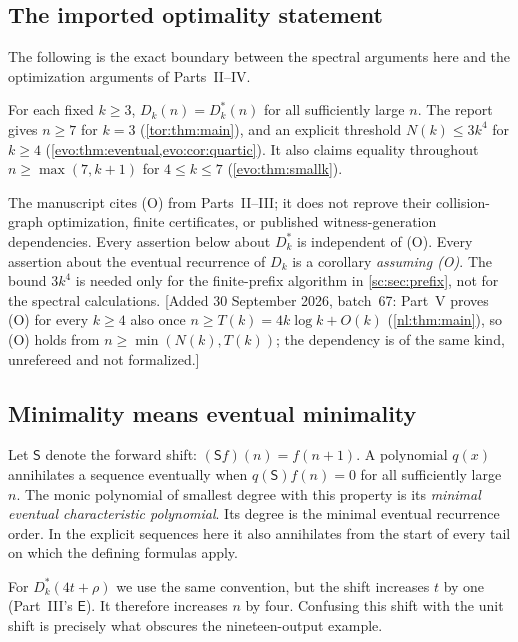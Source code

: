 \documentclass[11pt,a4paper]{article}
\numberwithin{equation}{section}
\theoremstyle{definition}
\theoremstyle{remark}
\begin{document}
\subsection{The imported optimality statement}\label{sc:sec:imported}
The following is the exact boundary between the spectral arguments here
and the optimization arguments of Parts~II--IV.

\begin{description}[style=nextline,leftmargin=1.0cm]
\item[Repository input (O).]
For each fixed $k\ge3$, $D_k(n)=D^*_k(n)$ for all sufficiently large $n$.
The report gives $n\ge7$ for $k=3$ (\cref{tor:thm:main}), and an explicit
threshold $N(k)\le3k^4$ for $k\ge4$ (\cref{evo:thm:eventual,evo:cor:quartic}).
It also claims equality throughout $n\ge\max(7,k+1)$ for $4\le k\le7$
(\cref{evo:thm:smallk}).
\end{description}

The manuscript cites (O) from Parts~II--III; it does not reprove their
collision-graph optimization, finite certificates, or published
witness-generation dependencies. Every assertion below about $D^*_k$ is
independent of (O). Every assertion about the eventual recurrence of $D_k$
is a corollary \emph{assuming (O)}. The bound $3k^4$ is needed only for the
finite-prefix algorithm in \cref{sc:sec:prefix}, not for the spectral
calculations. [Added 30 September 2026, batch~67: Part~V proves (O) for
every $k\ge4$ also once $n\ge T(k)=4k\log k+O(k)$ (\cref{nl:thm:main}), so
(O) holds from $n\ge\min(N(k),T(k))$; the dependency is of the same kind,
unrefereed and not formalized.]

\subsection{Minimality means eventual minimality}
Let $\mathsf S$ denote the forward shift: $(\mathsf Sf)(n)=f(n+1)$. A
polynomial $q(x)$ annihilates a sequence eventually when
$q(\mathsf S)f(n)=0$ for all sufficiently large $n$. The monic polynomial of
smallest degree with this property is its \emph{minimal eventual
characteristic polynomial}. Its degree is the minimal eventual recurrence
order. In the explicit sequences here it also annihilates from the start of
every tail on which the defining formulas apply.

For $D^*_k(4t+\rho)$ we use the same convention, but the shift increases
$t$ by one (Part~III's $\mathsf E$). It therefore increases $n$ by four.
Confusing this shift with the unit shift is precisely what obscures the
nineteen-output example.
\end{document}
